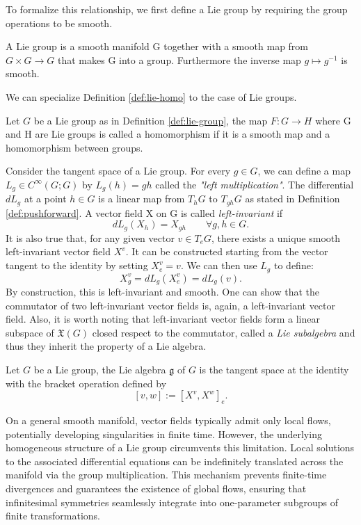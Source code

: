 To formalize this relationship, we first define a Lie group by requiring the group operations to be smooth.

\begin{definition}\label{def:lie-group}
	A Lie group is a smooth manifold G together with a smooth map from $G \times G \to G$ that makes G into a group. Furthermore the inverse map $g \mapsto g^{-1}$ is smooth.
\end{definition}

\noindent We can specialize Definition \ref{def:lie-homo} to the case of Lie groups.

\begin{definition}\label{def:lie-grhomo}
	Let $G$ be a Lie group as in Definition \ref{def:lie-group}, the map $F: G \to H$ where G and H are Lie groups is called a homomorphism if it is a smooth map and a homomorphism between groups.
\end{definition}

Consider the tangent space of a Lie group. For every $g \in G$, we can define a map $L_g \in C^\infty(G;G)$ by $L_g(h) = gh$ called the \textit{"left multiplication"}. The differential $dL_g$ at a point $h \in G$ is a linear map from $T_hG$ to $T_{gh}G$ as stated in Definition \ref{def:pushforward}. A vector field X on G is called \textit{left-invariant} if
\[
	dL_g (X_h) = X_{gh} \qquad \forall g,h \in G.
\]
It is also true that, for any given vector $v \in T_eG$, there exists a unique smooth left-invariant vector field $X^v$. It can be constructed starting from the vector tangent to the identity by setting $X^v_e = v$. We can then use $L_g$ to define:
\[
	X^v_g = dL_g (X^v_e) = dL_g(v).
\]
By construction, this is left-invariant and smooth.
One can show that the commutator of two left-invariant vector fields is, again, a left-invariant vector field. Also, it is worth noting that left-invariant vector fields form a linear subspace of $\mathfrak{X}(G)$ closed respect to the commutator, called a \textit{Lie subalgebra} and thus they inherit the property of a Lie algebra. 

\begin{definition}\label{def:lie-gralg}
	Let $G$ be a Lie group, the Lie algebra $\mathfrak{g}$ of $G$ is the tangent space at the identity with the bracket operation defined by
	\[
		[v, w] := [X^v, X^w]_e.
	\] 
\end{definition}

\noindent On a general smooth manifold, vector fields typically admit only local flows, potentially developing singularities in finite time. However, the underlying homogeneous structure of a Lie group circumvents this limitation. Local solutions to the associated differential equations can be indefinitely translated across the manifold via the group multiplication. This mechanism prevents finite-time divergences and guarantees the existence of global flows, ensuring that infinitesimal symmetries seamlessly integrate into one-parameter subgroups of finite transformations. 


